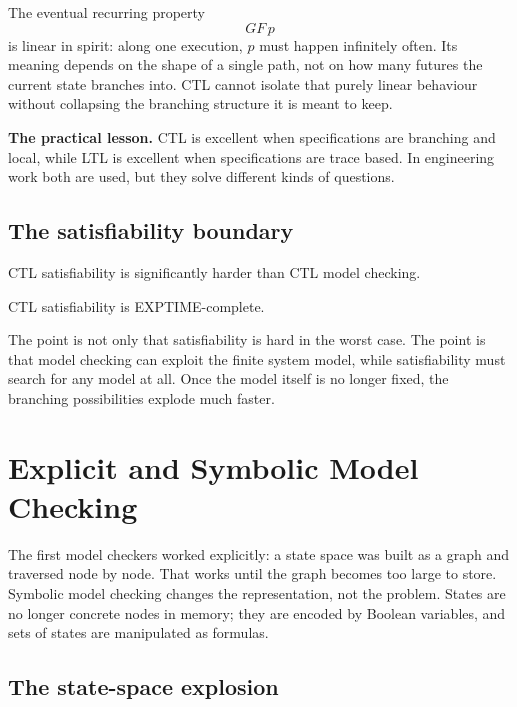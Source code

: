 \begin{example}
The eventual recurring property
\[
  GF\,p
\]
is linear in spirit: along one execution, $p$ must happen infinitely often.
Its meaning depends on the shape of a single path, not on how many futures
the current state branches into.  CTL cannot isolate that purely linear
behaviour without collapsing the branching structure it is meant to keep.
\end{example}

\medskip\noindent
\textbf{The practical lesson.}  CTL is excellent when specifications are
branching and local, while LTL is excellent when specifications are trace
based.  In engineering work both are used, but they solve different kinds of
questions.

\subsection{The satisfiability boundary}

CTL satisfiability is significantly harder than CTL model checking.

\begin{proposition}
CTL satisfiability is EXPTIME-complete.
\end{proposition}

\medskip\noindent
The point is not only that satisfiability is hard in the worst case.  The
point is that model checking can exploit the finite system model, while
satisfiability must search for any model at all.  Once the model itself is no
longer fixed, the branching possibilities explode much faster.

\section{Explicit and Symbolic Model Checking}
\label{sec:symbolic-vs-explicit}

The first model checkers worked explicitly: a state space was built as a graph
and traversed node by node.  That works until the graph becomes too large to
store.  Symbolic model checking changes the representation, not the problem.
States are no longer concrete nodes in memory; they are encoded by Boolean
variables, and sets of states are manipulated as formulas.

\subsection{The state-space explosion}

